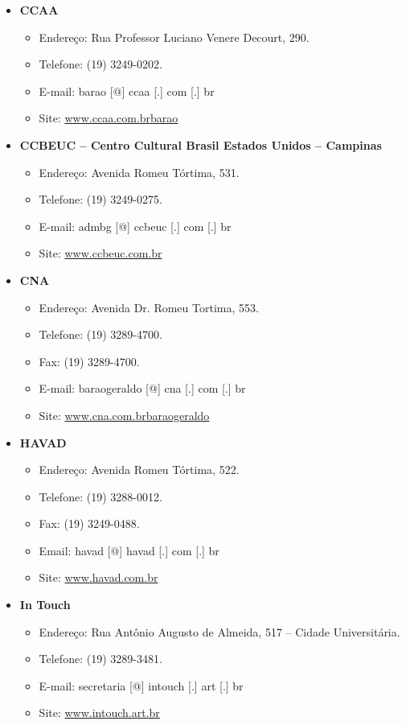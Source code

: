 \begin{itemize}
\item  \textbf{CCAA}
\begin{itemize}
\item  Endereço: Rua Professor Luciano Venere Decourt, 290.
\item  Telefone: (19) 3249-0202.
\item  E-mail: barao [@] ccaa [.] com [.] br
\item  Site: \url{www.ccaa.com.brbarao}
\end{itemize}

\item  \textbf{CCBEUC -- Centro Cultural Brasil Estados Unidos -- Campinas}
\begin{itemize}
\item  Endereço: Avenida Romeu Tórtima, 531.
\item  Telefone: (19) 3249-0275.
\item  E-mail: admbg [@] ccbeuc [.] com [.] br
\item  Site: \url{www.ccbeuc.com.br}
\end{itemize}

\item  \textbf{CNA}
\begin{itemize}
\item  Endereço: Avenida Dr. Romeu Tortima, 553.
\item  Telefone: (19) 3289-4700.
\item  Fax: (19) 3289-4700.
\item  E-mail: baraogeraldo [@] cna [.] com [.] br
\item  Site: \url{www.cna.com.brbaraogeraldo}
\end{itemize}

\item  \textbf{HAVAD}
\begin{itemize}
\item  Endereço: Avenida Romeu Tórtima, 522.
\item  Telefone: (19) 3288-0012.
\item  Fax: (19) 3249-0488.
\item  Email: havad [@] havad [.] com [.] br
\item  Site: \url{www.havad.com.br}
\end{itemize}

\item  \textbf{In Touch}
\begin{itemize}
\item  Endereço: Rua Antônio Augusto de Almeida, 517 -- Cidade Universitária.
\item  Telefone: (19) 3289-3481.
\item  E-mail: secretaria [@] intouch [.] art [.] br
\item  Site: \url{www.intouch.art.br}
\end{itemize}


\end{itemize}
